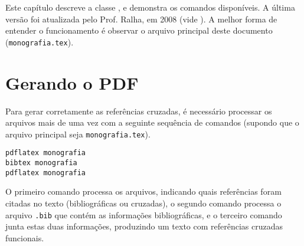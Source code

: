 \newcommand{\texCommand}[1]{\texttt{\textbackslash{#1}}}%

\newcommand{\exemplo}[1]{%
\vspace{\baselineskip}%
\noindent\fbox{\begin{minipage}{\textwidth}#1\end{minipage}}%
\\\vspace{\baselineskip}}%

\newcommand{\exemploVerbatim}[1]{%
\vspace{\baselineskip}%
\noindent\fbox{\begin{minipage}{\textwidth}%
#1\end{minipage}}%
\\\vspace{\baselineskip}}%


Este capítulo descreve a classe \unbcic, e demonstra os comandos disponíveis. A 
última versão foi atualizada pelo Prof. Ralha, em 2008 (vide ). 
A melhor forma de entender o funcionamento é observar o arquivo principal deste 
documento (\texttt{monografia.tex}).


\section{Gerando o PDF}

Para gerar corretamente as referências cruzadas, é necessário processar os arquivos 
mais de uma vez com a seguinte sequência de comandos (supondo que o arquivo 
principal seja \texttt{monografia.tex}).

\begin{verbatim}
pdflatex monografia
bibtex monografia
pdflatex monografia
\end{verbatim}

O primeiro comando processa os arquivos, indicando quais referências foram citadas
no texto (bibliográficas ou cruzadas), o segundo comando processa o arquivo
\texttt{.bib} que contém as informações bibliográficas, e o terceiro comando junta
estas duas informações, produzindo um texto com referências cruzadas funcionais.



